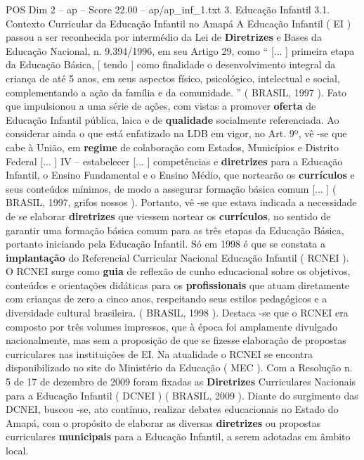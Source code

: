 \begin{textsample}{POS Dim 2 – ap – Score 22.00 – ap/ap\_inf\_1.txt}  \label{ex:f2_pos_148}
3.
Educação Infantil 3.1.
Contexto Curricular da Educação Infantil no Amapá A Educação Infantil ( EI ) passou a ser reconhecida por intermédio da Lei de \textbf{Diretrizes} e Bases da Educação Nacional, n. 9.394/1996, em seu Artigo 29, como “ [... ] primeira etapa da Educação Básica, [ tendo ] como finalidade o desenvolvimento integral da criança de até 5 anos, em seus aspectos físico, psicológico, intelectual e social, complementando a ação da família e da comunidade. ” ( BRASIL, 1997 ).
Fato que impulsionou a uma série de ações, com vistas a promover \textbf{oferta} de Educação Infantil pública, laica e de \textbf{qualidade} socialmente referenciada.
Ao considerar ainda o que está enfatizado na LDB em vigor, no Art. 9º, vê -se que cabe à União, em \textbf{regime} de colaboração com Estados, Municípios e Distrito Federal [... ] IV – estabelecer [... ] competências e \textbf{diretrizes} para a Educação Infantil, o Ensino Fundamental e o Ensino Médio, que nortearão os \textbf{currículos} e seus conteúdos mínimos, de modo a assegurar formação básica comum [... ] ( BRASIL, 1997, grifos nossos ).
Portanto, vê -se que estava indicada a necessidade de se elaborar \textbf{diretrizes} que viessem nortear os \textbf{currículos}, no sentido de garantir uma formação básica comum para as três etapas da Educação Básica, portanto iniciando pela Educação Infantil.
Só em 1998 é que se constata a \textbf{implantação} do Referencial Curricular Nacional Educação Infantil ( RCNEI ).
O RCNEI surge como \textbf{guia} de reflexão de cunho educacional sobre os objetivos, conteúdos e orientações didáticas para os \textbf{profissionais} que atuam diretamente com crianças de zero a cinco anos, respeitando seus estilos pedagógicos e a diversidade cultural brasileira. ( BRASIL, 1998 ).
Destaca -se que o RCNEI era composto por três volumes impressos, que à época foi amplamente divulgado nacionalmente, mas sem a proposição de que se fizesse elaboração de propostas curriculares nas instituições de EI.
Na atualidade o RCNEI se encontra disponibilizado no site do Ministério da Educação ( MEC ).
Com a Resolução n. 5 de 17 de dezembro de 2009 foram fixadas as \textbf{Diretrizes} Curriculares Nacionais para a Educação Infantil ( DCNEI ) ( BRASIL, 2009 ).
Diante do surgimento das DCNEI, buscou -se, ato contínuo, realizar debates educacionais no Estado do Amapá, com o propósito de elaborar as diversas \textbf{diretrizes} ou propostas curriculares \textbf{municipais} para a Educação Infantil, a serem adotadas em âmbito local.

\end{textsample}
